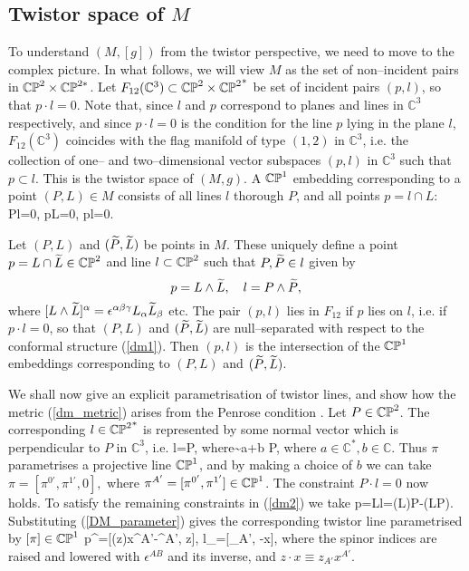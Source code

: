 \subsection{Twistor space of $M$}
\label{twist_SSS}
To understand $(M,[g])$ from the twistor perspective, we need to move to the complex picture. In what follows, we will view $M$ as the set of non--incident pairs in $\mathbb{CP}^2\times\mathbb{CP}^{2*}$. Let $F_{12}(\mathbb{C}^3)\subset \mathbb{CP}^2\times {\mathbb{CP}^2}^*$ be set of incident pairs 
$(p, l)$, so that $p\cdot l=0$. Note that, since $l$ and $p$ correspond to planes and lines in $\mathbb{C}^3$ respectively, and since $p\cdot l=0$ is the condition for the line $p$ lying in the plane $l$, $F_{12}(\mathbb{C}^3)$ coincides with the flag manifold of type $(1,2)$ in $\mathbb{C}^3$, i.e. the collection of one-- and two--dimensional vector subspaces $(p,l)$ in $\mathbb{C}^3$ such that $p\subset l$. This is the twistor space of $(M, g)$.
A $\mathbb{CP}^1$ embedding corresponding to a point $(P, L)\in M$
consists of all lines $l$ thorough $P$, and all points
$p=l\cap L$:
\be
\label{dm2}
P\cdot l=0, \quad p\cdot L=0, \quad p\cdot l=0.
\ee

Let $(P, L)$ and $(\widetilde{P}, \widetilde{L})$ be points in $M$. These uniquely define a point $p=L\cap\widetilde{L}\in\mathbb{CP}^2$ and line $l\subset\mathbb{CP}^2$ such that $P,\widetilde{P}\in l$ given by
\[
p=L\wedge \widetilde{L}, \quad l=P\wedge \widetilde{P},
\]
where $[L\wedge\widetilde{L}]^{\alpha}=\epsilon^{\alpha\beta\gamma}L_{\alpha}\widetilde{L}_{\beta}$ etc.
The pair $(p,l)$ lies in $F_{12}$ if $p$ lies on $l$, i.e. if $p\cdot l=0$, so that $(P, L)$ and $(\widetilde{P}, \widetilde{L})$ are null--separated with respect to the conformal structure
(\ref{dm1}). Then $(p,l)$ is the intersection of the $\mathbb{CP}^1$ embeddings corresponding to $(P, L)$ and $(\widetilde{P}, \widetilde{L})$. %

We shall now give an explicit parametrisation of twistor lines, and show how 
the metric (\ref{dm_metric}) arises from the Penrose condition 
\cite{penrose, ward}.
Let $P\in \mathbb{CP}^2$. The corresponding $l\in {\mathbb{CP}^2}^*$ is represented by some normal vector which is perpendicular to $P$ in $\mathbb{C}^3$, i.e.
\be \label{eq:l=Pwedgepi}
l=P\wedge \pi, \quad \mbox{where}\quad  \pi\sim a\pi+b P,
\ee
where $a\in \mathbb{C}^*, b\in \mathbb{C}$. Thus $\pi$ parametrises a projective line $\mathbb{CP}^1$,
and by making a choice of $b$ we can take
$
\pi=[\pi^{0'}, \pi^{1'}, 0], 
$ where $\pi^{A'}=[\pi^{0'}, \pi^{1'}]\in \mathbb{CP}^1$. The constraint $P\cdot l=0$ now holds.
To satisfy the remaining constraints in (\ref{dm2}) we take
\be \label{eq:p=Lwedgel}
p=L\wedge l=(L\cdot\pi)P-(L\cdot P)\pi.
\ee
Substituting (\ref{DM_parameter}) gives 
the corresponding twistor line parametrised by $[\pi]\in\mathbb{CP}^1$ 
\be
\label{sl3curves}
p^{\alpha}=[(z\cdot \pi)x^{A'}-\pi^{A'}, z\cdot \pi], \quad l_\alpha=[\pi_{A'}, -\pi\cdot x],
\ee
where the spinor indices are raised and lowered with $\epsilon^{AB}$ and its inverse, and  $z\cdot x\equiv z_{A'}x^{A'}$. 

